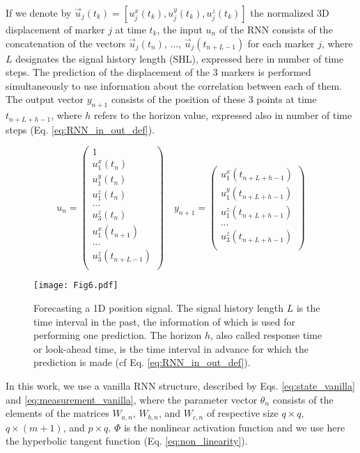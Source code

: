\documentclass[twocolumn,a4paper]{svjour3} \sloppy          \smartqed
\begin{document}
If we denote by $\vec{u}_j(t_k) = [u_j^x(t_k), u_j^y(t_k), u_j^z(t_k)]$ the normalized 3D displacement of marker $j$ at time $t_k$, the input $u_n$ of the RNN consists of the concatenation of the vectors $\vec{u}_j(t_n)$, ..., $\vec{u}_j(t_{n+L-1})$ for each marker $j$, where $L$ designates the signal history length (SHL), expressed here in number of time steps. The prediction of the displacement of the 3 markers is performed simultaneously to use information about the correlation between each of them. The output vector $y_{n+1}$ consists of the position of these 3 points at time $t_{n+L+h-1}$, where $h$ refers to the horizon value, expressed also in number of time steps (Eq. \ref{eq:RNN_in_out_def}).

\begin{equation} \label{eq:RNN_in_out_def}
u_n
=
\begin{pmatrix}
1 \\
u_1^x(t_n)\\
u_1^y(t_n)\\
u_1^z(t_n)\\
...\\
u_3^z(t_n)\\
u_1^x(t_{n+1})\\
...\\
u_3^z(t_{n+L-1})\\
\end{pmatrix}
\quad
y_{n+1}
=
\begin{pmatrix}
u_1^x(t_{n+L+h-1})\\
u_1^y(t_{n+L+h-1})\\
u_1^z(t_{n+L+h-1})\\
...\\
u_3^z(t_{n+L+h-1})\\
\end{pmatrix}
\end{equation}

\begin{figure} [thb!]
	\centering
\texttt{[image: Fig6.pdf]}
	\caption{Forecasting a 1D position signal. The signal history length $L$ is the time interval in the past, the information of which is used for performing one prediction. The horizon $h$, also called response time or look-ahead time, is the time interval in advance for which the prediction is made (cf Eq. \ref{eq:RNN_in_out_def}).}
\end{figure}

In this work, we use a vanilla RNN structure, described by Eqs. \ref{eq:state_vanilla} and \ref{eq:measurement_vanilla}, where the parameter vector $\theta_n$ consists of the elements of the matrices $W_{a,n}$, $W_{b,n}$, and $W_{c,n}$ of respective size $q \times q$, $q \times (m+1)$, and $p \times q$. $\Phi$ is the nonlinear activation function and we use here the hyperbolic tangent function (Eq. \ref{eq:non_linearity}). 
\end{document}

